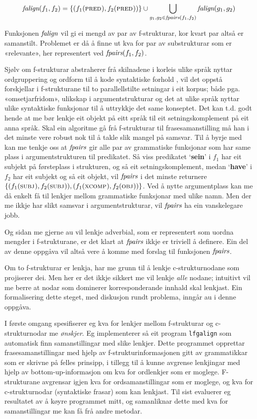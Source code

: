 \documentclass[12pt,a4paper,oneside,draft]{report}
\newcommand{\F}[2]{\textsc{#1}\ensuremath{_{#2}}}
\newcommand{\OBJ}{\F{obj}{}}
\newcommand{\XCOMP}{\F{xcomp}{}}
\newcommand{\SUBJ}{\F{subj}{}}
\newcommand{\PRED}{\F{pred}{}}
\newcommand{\falign}{\ensuremath{\operatorname{\emph{falign}}}}
\newcommand{\fpairs}{\ensuremath{\operatorname{\emph{fpairs}}}}
\newcommand{\p}[1]{`\textbf{#1}'}
\begin{document}
\[
\falign(f_{1}, f_{2}) =
\{ (f_{1}(\PRED), f_{2}(\PRED)) \}
\cup
\bigcup_{g_{1},g_{2}\in \fpairs(f_{1},f_{2})} \falign(g_{1}, g_{2})
\]

Funksjonen \falign{} vil gi ei mengd av par av f-strukturar, kor kvart
par altså er samanstilt. Problemet er då å finne ut kva for par av
substrukturar som er «relevante», her representert ved
$\fpairs(f_{1},f_{2})$.


Sjølv om f-strukturar abstraherer frå skilnadene i korleis ulike språk
nyttar ordgruppering og ordform til å kode syntaktiske forhold
\citep[s.~14]{bresnan2001lfs}, vil det  oppstå forskjellar i
f-strukturane til to parallellstilte setningar i eit korpus; både
pga. «omsetjarfridom», ulikskap i argumentstrukturar og det at ulike
språk nyttar ulike syntaktiske funksjonar til å uttrykkje det same
konseptet. Det kan t.d. godt hende at me bør lenkje eit objekt på eitt
språk til eit setningskomplement på eit anna språk. Skal ein algoritme
gå frå f-strukturar til frasesamanstilling må han i det minste vere
robust nok til å takle slik mangel på samsvar. Til å byrje med kan me
tenkje oss at \fpairs{} gir alle par av grammatiske funksjonar som har
same plass i argumentstrukturen til predikatet. Så viss predikatet
\p{sein} i $f_1$ har eit subjekt på førsteplass i strukturen, og så
eit setningskomplement, medan \p{have} i $f_2$ har eit subjekt og så
eit objekt, vil \fpairs{} i det minste returnere
$\{(f_{1}(\SUBJ),f_{2}(\SUBJ)),(f_{1}(\XCOMP),f_{2}(\OBJ))\}$.  Ved å
nytte argumentplass kan me då enkelt få til lenkjer mellom grammatiske
funksjonar med ulike namn.  Men der me ikkje har slikt samsvar i
argumentstrukturar, vil \fpairs{} ha ein vanskelegare jobb.

Og sidan me gjerne au vil lenkje adverbial, som er representert som
uordna mengder i f-strukturane, er det klart at \fpairs{} ikkje er
triviell å definere. Ein del av denne oppgåva vil altså vere å komme
med forslag til funksjonen \fpairs{}.

Om to f-strukturar er lenkja, har me grunn til å lenkje
c-strukturnodane som projiserer dei. Men her er det ikkje sikkert me
vil lenkje \emph{alle} nodane; intuitivt vil me berre at nodar som
dominerer korresponderande innhald skal lenkjast.  Ein formalisering
dette steget, med diskusjon rundt problema, inngår au i denne oppgåva.

I første omgang spesifiserer eg kva for lenkjer mellom f-strukturar og
 c-strukturnodar me \emph{ønskjer}. Eg implementerer så eit program
 \texttt{lfgalign} som automatisk finn samanstillingar med slike lenkjer.
 Dette programmet opprettar frasesamanstillingar med hjelp av
 f-strukturinformasjonen gitt av grammatikkar som er skrivne på felles
 prinsipp, i tillegg til å kunne avgrense lenkjingar med hjelp av
 bottom-up-informasjon om kva for ordlenkjer som er
 moglege. F-strukturane avgrensar igjen kva for ordsamanstillingar som
 er moglege, og kva for c-strukturnodar (syntaktiske frasar) som kan
 lenkjast. Til sist evaluerer eg resultatet av å køyre programmet
 mitt, og samanliknar dette med kva for samanstillingar me kan få frå
 andre metodar.
\end{document}
